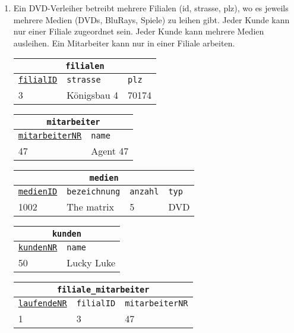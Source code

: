 \begin{Answer}[ref=TabelleErstellen1]
\begin{enumerate}
        \medskip

		\item Ein DVD-Verleiher betreibt mehrere Filialen (id, strasse, plz), wo es jeweils mehrere Medien (DVDs, BluRays, Spiele) zu leihen gibt. Jeder Kunde kann nur einer Filiale zugeordnet sein. Jeder Kunde kann mehrere Medien ausleihen. Ein Mitarbeiter kann nur in einer Filiale arbeiten.

		\begin{tabular}{lll}
			\multicolumn{3}{c}{\lstinline!filialen!}\\
			\hline
			\underline{\lstinline!filialID!}&\lstinline!strasse!&\lstinline!plz!\\
			\hline
			3&Königsbau 4&70174\\
		\end{tabular}

        \medskip

		\begin{tabular}{ll}
			\multicolumn{2}{c}{\lstinline!mitarbeiter!}\\
			\hline
			\underline{\lstinline!mitarbeiterNR!}&\lstinline!name!\\
			\hline
			47&Agent 47\\
		\end{tabular}

        \medskip

		\begin{tabular}{llll}
			\multicolumn{4}{c}{\lstinline!medien!}\\
			\hline
			\underline{\lstinline!medienID!}&\lstinline!bezeichnung!&\lstinline!anzahl!&\lstinline!typ!\\
			\hline
			1002&The matrix&5&DVD\\
		\end{tabular}

        \medskip

		\begin{tabular}{ll}
			\multicolumn{2}{c}{\lstinline!kunden!}\\
			\hline
			\underline{\lstinline!kundenNR!}&\lstinline!name!\\
			\hline
			50&Lucky Luke\\
		\end{tabular}

        \medskip

		\begin{tabular}{lll}
			\multicolumn{3}{c}{\lstinline!filiale_mitarbeiter!}\\
			\hline
			\underline{\lstinline!laufendeNR!}&\lstinline!filialID!&\lstinline!mitarbeiterNR!\\
			\hline
			1&3&47\\
		\end{tabular}


\end{enumerate}
\end{Answer}
